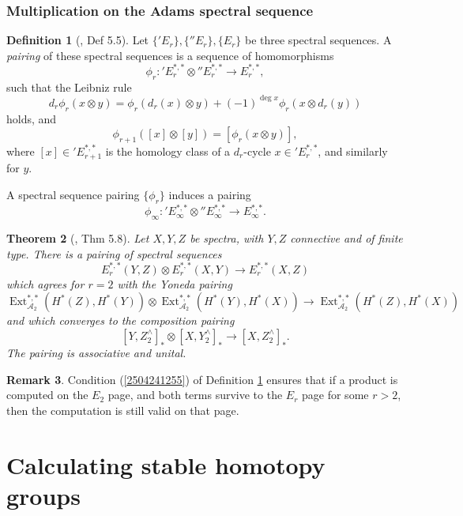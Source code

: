 \documentclass[11pt, titlepage]{article} %
\def\A{\ensuremath{\mathscr{A}_2}}
\DeclareMathOperator{\Ext}{Ext}
\numberwithin{equation}{subsection}
\theoremstyle{plain}
\newtheorem{theorem}{Theorem}[subsection]
\theoremstyle{definition}
\newtheorem{definition}[theorem]{Definition}
\newtheorem{remark}[theorem]{Remark}
\begin{document}
\subsubsection{Multiplication on the Adams spectral sequence}

\begin{definition}[{\autocite{ass}, Def 5.5}]\label{2504241258}
Let \(\{'E_r\}, \{''E_r\}, \{E_r\}\) be three spectral sequences. A \textit{pairing} of these spectral sequences is a sequence of homomorphisms 
\[\phi_r : \text{}'E_r^{*,*}\otimes \text{}''E_r^{*,*} \to E_r^{*,*},\]
such that the Leibniz rule
\[d_r\phi_r(x\otimes y)=\phi_r(d_r(x)\otimes y)+(-1)^{\deg x}\phi_r(x\otimes d_r(y))\]
holds, and
\begin{equation}\label{2504241255}
\phi_{r+1}([x]\otimes[y])=[\phi_r(x\otimes y)],
\end{equation}
where \([x]\in \text{}'E_{r+1}^{*,*}\) is the homology class of a \(d_r\)-cycle \(x\in \text{}'E_r^{*,*}\), and similarly for \(y\).
\end{definition}

A spectral sequence pairing \(\{\phi_r\}\) induces a pairing 
\[\phi_\infty : \text{}'E_\infty^{*,*}\otimes \text{}''E^{*,*}_\infty \to E^{*,*}_\infty.\]

\begin{theorem}[{\autocite{ass}, Thm 5.8}]
Let \(X,Y,Z\) be spectra, with \(Y, Z\) connective and of finite type. There is a pairing of spectral sequences
\[E^{*,*}_r(Y,Z)\otimes E^{*,*}_r(X,Y)\to E^{*,*}_r(X,Z)\]
which agrees for \(r=2\) with the Yoneda pairing
\[\Ext^{*,*}_{\A}(H^*(Z), H^*(Y))\otimes \Ext_{\A}^{*,*}(H^*(Y), H^*(X))\to \Ext_{\A}^{*,*}(H^*(Z), H^*(X))\]
and which converges to the composition pairing
\[[Y, Z^\wedge_2]_*\otimes [X,Y^\wedge_2]_* \to [X, Z^\wedge_2]_*.\]
The pairing is associative and unital.
\end{theorem}

\begin{remark}
Condition (\ref{2504241255}) of Definition \ref{2504241258} ensures that if a product is computed on the \(E_2\) page, and both terms survive to the \(E_r\) page for some \(r>2\), then the computation is still valid on that page.
\end{remark}

\section{Calculating stable homotopy groups}
\end{document}
